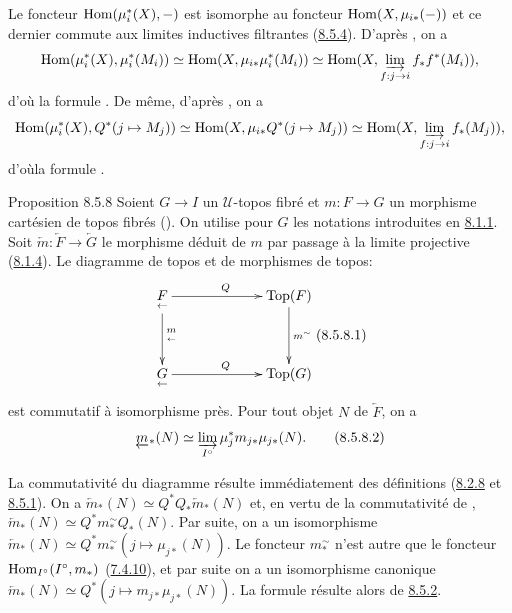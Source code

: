 \documentclass[10pt]{../fichiers-configuration-latex/smfart}
\begin{document}
Le foncteur $\operatorname{Hom}(\mu^{\ast}_i (X), -)$ est isomorphe au foncteur
$\operatorname{Hom}(X, \mu_{i \ast} (-))$ et ce dernier commute aux limites
inductives filtrantes (\hyperref[VI.cor8.5.4]{8.5.4}). D'après , on a
$$
\Hom(\mu^{\ast}_i(X), \mu^{\ast}_i (M_i)) \simeq \Hom (X, \mu_{i\ast}
  \mu^{\ast}_i (M_i)) \simeq  \Hom(X, \varinjlim_{f : j \to
  i} f_{\ast} f^{\ast} (M_i)){\quoi},
$$
d'où la formule . De même, d'après , on a
$$
\Hom(\mu^{\ast}_i (X), Q^{\ast}(j \mapsto M_j)) \simeq \Hom(X,
\mu_{i\ast} Q^{\ast} (j \mapsto M_j)) \simeq \Hom(X,
\varinjlim_{f : j \to i} f_{\ast} (M_j)){\quoi},
$$
d'où\pageoriginale la formule .

\begin{enonce*}{Proposition 8.5.8}
Soient $G \to I$ un $𝒰$-topos fibré et $m : F \to G$  un morphisme
cartésien de topos fibrés (). On
utilise pour $G$ les notations
introduites en \hyperref[VI.def8.1.1]{8.1.1}. Soit $\underleftarrow{m} : \underleftarrow{F} \to
\underleftarrow{G}$ le morphisme déduit de $m$ par passage à la limite
projective (\hyperref[VI.subsubsec8.1.4]{8.1.4}). Le diagramme de topos et de morphismes de topos:
\[\vcenter{
\xymatrix@C=2.25cm@R=1.25cm{
\underset{\leftarrow}{F}  \ar[r]^{Q} \ar[d]^{\underset{\leftarrow}{m}}& \Top(F)\ar[d]^{m^{\sim}}\\
\underset{\leftarrow}{G}  \ar[r]^{Q} & \Top(G)
}}\leqno{(8.5.8.1)}
\]
est commutatif à isomorphisme près. Pour tout objet $N$ de
$\underleftarrow{F}$, on a
\begin{equation*}
\underleftarrow{m}_{\ast} (N) \simeq \varinjlim_{I^{\circ}} \mu_j^{\ast}
m_{j\ast} \mu_{j\ast} (N){}.\tag{8.5.8.2}
\end{equation*}
\end{enonce*}

La commutativité du diagramme  résulte
immédiatement des définitions (\hyperref[VI.subsubsec8.2.8]{8.2.8} et
\hyperref[VI.subsubsec8.5.1]{8.5.1}). On a $\underleftarrow{m}_{\ast} (N) \simeq
Q^{\ast} Q_{\ast} \underleftarrow{m}_{\ast} (N)$ et, en vertu de la
commutativité de , $\underleftarrow{m}_{\ast} (N)
\simeq Q^{\ast}m^{\sim}_{\ast} Q_{\ast} (N)$. Par suite, on a un
isomorphisme $\underleftarrow{m}_{\ast} (N) \simeq Q^{\ast}
m^{\sim}_{\ast} (j \mapsto \mu_{j\ast} (N))$. Le foncteur
$m_{\ast}^{\sim}$ n'est autre que le foncteur $\operatorname{Hom}_{I^{\circ}}
(I^{\circ}, m_{\ast})$ (\hyperref[VI.prop7.4.10]{7.4.10}), et par suite on a un
isomorphisme canonique $\underleftarrow{m}_{\ast} (N) \simeq
Q^{\ast} (j \mapsto m_{j\ast} \mu_{j\ast} (N))$. La formule
 résulte alors de \hyperref[VI.prop8.5.2]{8.5.2}.
\end{document}
